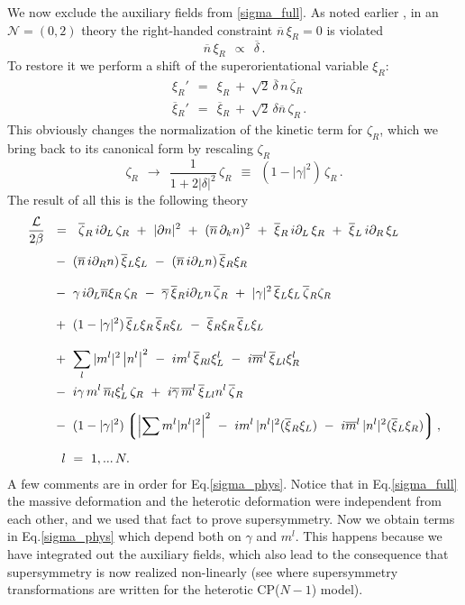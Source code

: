 \documentclass[12pt]{article}
\newcommand{\ntwoo}{${\mathcal N}= \left(0,2\right) $ }
\newcommand{\p}{\partial}
\newcommand{\ov}{\overline}
\newcommand{\mc}[1]{\mathcal{#1}}
\newcommand{\lgr}{\left\lgroup}
\newcommand{\rgr}{\right\rgroup}
\newcommand{\bxir}{\ov{\xi}{}_R}
\newcommand{\bxil}{\ov{\xi}{}_L}
\newcommand{\xir}{\xi_R}
\newcommand{\xil}{\xi_L}
\newcommand{\bzr}{\ov{\zeta}{}_R}
\newcommand{\zr}{\zeta_R}
\newcommand{\nbar}{\ov{n}}
\begin{document}
        We now exclude the auxiliary fields from \eqref{sigma_full}. 
        As noted earlier \cite{Edalati,SYhet}, in an \ntwoo theory the right-handed constraint $ \nbar\,\xir = 0 $ is
        violated
\[
	\nbar\, \xir ~~\propto~~ \ov{\delta}\,.
\]
	To restore it we perform a shift of the superorientational variable $ \xir $:
\begin{align*}
%
	& \xi_R' ~~=~~ \xir ~+~ \sqrt{2}\, \ov{\delta}\, n\, \bzr \\
%
	& \ov{\xi}{}_R' ~~=~~ \bxir ~+~ \sqrt{2}\, \delta \nbar\, \zr\,.
\end{align*}
	This obviously changes the normalization of the kinetic term for $ \zr $, which we
	bring back to its canonical form by rescaling $ \zr $
\[
	\zr ~~\to~~ \frac{1}{1 + 2|\delta|^2}\,\zr ~~\equiv~~ ( 1 - |\gamma|^2 )\, \zr\,.
\]
	The result of all this is the following theory
\begin{align}
%
\notag
	\frac{\mc{L}}{2\beta} & ~~=~~ \bzr\, i\p_L\, \zr ~+~ 
		| \p n |^2  ~+~ (\nbar\, \p_k n)^2 ~+~ \bxir\, i\p_L\, \xir ~+~ \bxil\, i\p_R\, \xil
	\\[1mm]
%
\notag
	&~ 
	~-~ (\nbar\, i\p_R n)\, \bxil \xil ~-~  (\nbar\, i\p_L n)\, \bxir \xir
	\\[3mm]
%
\notag
	&~
	~-~ \gamma\, i\p_L\nbar \xir\, \zr ~-~ \ov{\gamma}\, \bxir i\p_L n\, \bzr
	~+~ |\gamma|^2\, \bxil \xil\, \bzr \zr
	\\[3mm]
%
\label{sigma_phys}
	&~
	~+~ (1-|\gamma|^2)\,\bxil\xir\,\bxir\xil ~-~ \bxir\xir\,\bxil\xil
	\\[3mm]
%	
\notag
	&~
	~+~ \sum_l |m^l|^2 \left|n^l \right|^2 
	~-~ i m^l\, \ov{\xi}{}_{Rl} \xi_L^l ~-~ i\ov{m}{}^l\, \ov{\xi}{}_{Ll} \xi_R^l
	\\
%
\notag
	&~
	~-~ i\gamma\, m^l\, \ov{n}{}_l \xi_L^l\, \zr 
	~+~ i\ov{\gamma}\, \ov{m}{}^l\, \ov{\xi}{}_{Ll} n^l\, \bzr
	\\[2mm]
%
\notag
	&~
	~-~ (1-|\gamma|^2)
	\lgr \left|\sum m^l |n^l|^2 \right|^2 
		~-~ i m^l\, |n^l|^2 (\bxir\xil) ~-~ i\ov{m}{}^l\, |n^l|^2(\bxil\xir)
	\rgr ,
	\\[2mm]
%
\notag
	&
	~~~~  l ~=~ 1,...\,N.
\end{align}	
	A few comments are in order for Eq.\eqref{sigma_phys}. 
	Notice that in Eq.\eqref{sigma_full} the massive deformation and the heterotic deformation
	were independent from each other, and we used that fact to prove supersymmetry.
	Now we obtain terms in Eq.\eqref{sigma_phys} which depend both on $\gamma$ and
	$m^l$.
	This happens because we have integrated out the auxiliary fields, which also lead to 
	the consequence that supersymmetry is now realized non-linearly 
	(see \cite{BSYhet} where supersymmetry transformations are written for the
	heterotic CP($N-1$) model).
\end{document}
